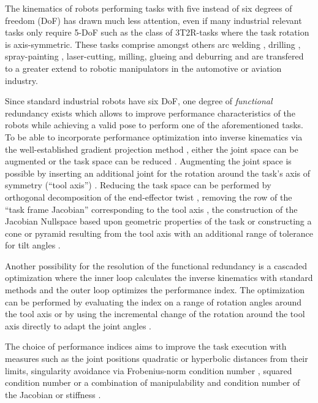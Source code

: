 \documentclass[twocolumn,10pt]{IFTOMM}
\begin{document}
The kinematics of robots performing tasks with five instead of six degrees of freedom (DoF) has drawn much less attention, even if many industrial relevant tasks only require 5-DoF such as the class of 3T2R-tasks where the task rotation is axis-symmetric.
These tasks comprise amongst others arc welding \cite{HuoBar2005}, drilling \cite{ZhuQuCaoYan2013,GuoDonKe2015}, spray-painting \cite{FromGra2010}, laser-cutting, milling, glueing and deburring and are transfered to a greater extend to robotic manipulators in the automotive or aviation industry.

Since standard industrial robots have six DoF, one degree of \emph{functional} redundancy exists which allows to improve performance characteristics of the robots while achieving a valid pose to perform one of the aforementioned tasks.
To be able to incorporate performance optimization into inverse kinematics via the well-established gradient projection method \cite{Yoshikawa1984}, either the joint space can be augmented or the task space can be reduced \cite{Huo2009}.
Augmenting the joint space is possible by inserting an additional joint for the rotation around the task's axis of symmetry (``tool axis'') \cite{Baron2000}.
Reducing the task space can be performed by orthogonal decomposition of the end-effector twist \cite{HuoBar2005}, removing the row of the ``task frame Jacobian'' corresponding to the tool axis \cite{Zlajpah2017}, the construction of the Jacobian Nullspace based upon geometric properties of the task \cite{LegerAng2016} or constructing a cone or pyramid resulting from the tool axis with an additional range of tolerance for tilt angles \cite{FromGra2010}.

Another possibility for the resolution of the functional redundancy is a cascaded optimization where the inner loop calculates the inverse kinematics with standard methods and the outer loop optimizes the performance index.
The optimization can be performed by evaluating the index on a range of rotation angles around the tool axis \cite{ZhuQuCaoYan2013} or by using the incremental change of the rotation around the tool axis directly to adapt the joint angles \cite{GuoDonKe2015}.

The choice of performance indices aims to improve the task execution with measures such as the joint positions quadratic \cite{HuoBar2005} or hyperbolic \cite{ZhuQuCaoYan2013} distances from their limits, singularity avoidance via Frobenius-norm condition number \cite{ZhuQuCaoYan2013}, squared condition number \cite{LegerAng2016} or a combination of manipulability and condition number of the Jacobian \cite{HuoBar2008} or stiffness \cite{GuoDonKe2015}.
\end{document}
